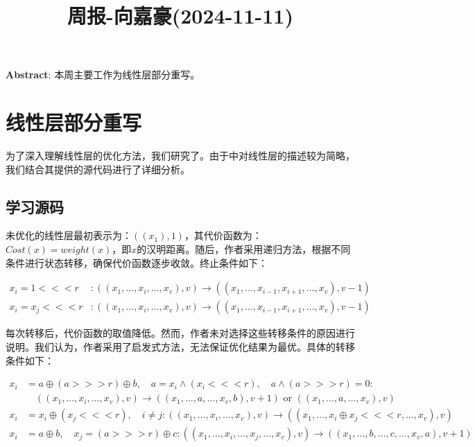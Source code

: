 \documentclass[11pt,a4paper]{article}
\title{周报-向嘉豪(2024-11-11)}
\newcommand{\lll}{\mathrel{<\!\!<\!\!<}}
\newcommand{\ggg}{\mathrel{>\!\!>\!\!>}}
\renewcommand{\maketitle}{
  \begin{center}
    \LARGE\bfseries\thetitle
  \end{center}
}
\begin{document}
\maketitle


\noindent \textbf{Abstract}: 本周主要工作为线性层部分重写。


\section{线性层部分重写}

为了深入理解线性层的优化方法，我们研究了\cite{Leurent2024}。由于\cite{Leurent2024}中对线性层的描述较为简略，我们结合其提供的源代码进行了详细分析。

\subsection{学习\cite{Leurent2024}源码}

未优化的线性层最初表示为：$((x_1), 1)$，其代价函数为：$Cost(x) = weight(x)$，即$x$的汉明距离。随后，作者采用递归方法，根据不同条件进行状态转移，确保代价函数逐步收敛。终止条件如下：

\begin{align*}
x_{i} = 1 \lll r & : ((x_1, \dots, x_{i}, \dots, x_v), v) \rightarrow ((x_1, \dots, x_{i-1}, x_{i+1}, \dots, x_v), v-1) \\
x_{i} = x_{j} \lll r & : ((x_1, \dots, x_{i}, \dots, x_v), v) \rightarrow ((x_1, \dots, x_{i-1}, x_{i+1}, \dots, x_v), v-1)
\end{align*}

每次转移后，代价函数的取值降低。然而，作者未对选择这些转移条件的原因进行说明。我们认为，作者采用了启发式方法，无法保证优化结果为最优。具体的转移条件如下：

\begin{align*}
x_i &= a \oplus (a \ggg r) \oplus b, \quad a = x_i \land (x_i \lll r), \quad a \land (a \ggg r) = 0 : \nonumber \\
&\quad ((x_1, \dots, x_{i}, \dots, x_v), v) \rightarrow ((x_1, \dots, a, \dots, x_v, b), v+1) \text{ or } ((x_1, \dots, a, \dots, x_v), v) \\
x_{i} &= x_{i} \oplus (x_{j} \lll r), \quad i \neq j : ((x_1, \dots, x_{i}, \dots, x_v), v) \rightarrow ((x_1, \dots, x_{i} \oplus x_{j} \lll r, \dots, x_v), v) \\
x_i &= a \oplus b, \quad x_j = (a \ggg r) \oplus c : ((x_1, \dots, x_{i}, \dots, x_{j}, \dots, x_v), v) \rightarrow ((x_1, \dots, b, \dots, c, \dots, x_v, a), v+1)
\end{align*}



\end{document}

